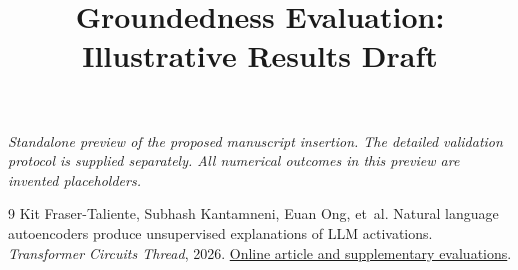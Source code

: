 \documentclass[10pt,twocolumn]{article}
\title{Groundedness Evaluation: Illustrative Results Draft}
\author{}
\date{}
\begin{document}
\raggedbottom
\maketitle
\thispagestyle{fancy}
\noindent\textit{Standalone preview of the proposed manuscript insertion.
The detailed validation protocol is supplied separately.
All numerical outcomes in this preview are invented placeholders.}
\setcounter{section}{2}
\setcounter{subsection}{5}

\begin{thebibliography}{9}
Kit Fraser-Taliente, Subhash Kantamneni, Euan Ong, et~al.
\newblock Natural language autoencoders produce unsupervised explanations of
LLM activations.
\newblock \emph{Transformer Circuits Thread}, 2026.
\newblock \href{https://transformer-circuits.pub/2026/nla/index.html}{Online article and supplementary evaluations}.
\end{thebibliography}
\end{document}
